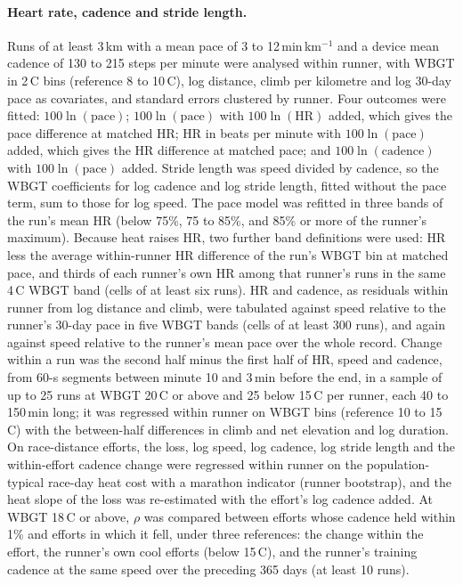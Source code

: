 \documentclass[12pt]{article}
\newcommand{\degC}{\,\textdegree C}
\begin{document}
\paragraph{Heart rate, cadence and stride length.} Runs of at least 3\,km with a mean pace of 3 to 12\,min\,km$^{-1}$ and a device mean cadence of 130 to 215 steps per minute were analysed within runner, with WBGT in 2\degC{} bins (reference 8 to 10\degC), log distance, climb per kilometre and log 30-day pace as covariates, and standard errors clustered by runner. Four outcomes were fitted: $100 \ln(\text{pace})$; $100 \ln(\text{pace})$ with $100 \ln(\text{HR})$ added, which gives the pace difference at matched HR; HR in beats per minute with $100 \ln(\text{pace})$ added, which gives the HR difference at matched pace; and $100 \ln(\text{cadence})$ with $100 \ln(\text{pace})$ added. Stride length was speed divided by cadence, so the WBGT coefficients for log cadence and log stride length, fitted without the pace term, sum to those for log speed. The pace model was refitted in three bands of the run's mean HR (below 75\%, 75 to 85\%, and 85\% or more of the runner's maximum). Because heat raises HR, two further band definitions were used: HR less the average within-runner HR difference of the run's WBGT bin at matched pace, and thirds of each runner's own HR among that runner's runs in the same 4\degC{} WBGT band (cells of at least six runs). HR and cadence, as residuals within runner from log distance and climb, were tabulated against speed relative to the runner's 30-day pace in five WBGT bands (cells of at least 300 runs), and again against speed relative to the runner's mean pace over the whole record. Change within a run was the second half minus the first half of HR, speed and cadence, from 60-s segments between minute 10 and 3\,min before the end, in a sample of up to 25 runs at WBGT 20\degC{} or above and 25 below 15\degC{} per runner, each 40 to 150\,min long; it was regressed within runner on WBGT bins (reference 10 to 15\degC) with the between-half differences in climb and net elevation and log duration. On race-distance efforts, the loss, log speed, log cadence, log stride length and the within-effort cadence change were regressed within runner on the population-typical race-day heat cost with a marathon indicator (runner bootstrap), and the heat slope of the loss was re-estimated with the effort's log cadence added. At WBGT 18\degC{} or above, $\rho$ was compared between efforts whose cadence held within 1\% and efforts in which it fell, under three references: the change within the effort, the runner's own cool efforts (below 15\degC), and the runner's training cadence at the same speed over the preceding 365 days (at least 10 runs).
\end{document}

